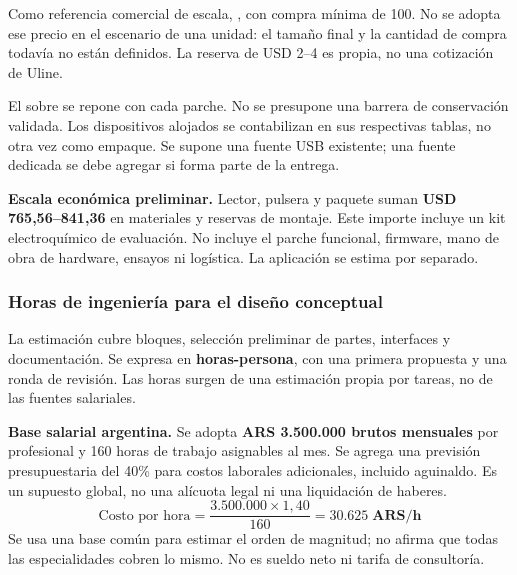 \documentclass[11pt,a4paper]{article}
\begin{document}
\small
Como referencia comercial de escala, , con compra mínima de 100. No se adopta ese precio en el escenario de una unidad: el tamaño final y la cantidad de compra todavía no están definidos. La reserva de USD 2--4 es propia, no una cotización de Uline.

El sobre se repone con cada parche. No se presupone una barrera de conservación validada. Los dispositivos alojados se contabilizan en sus respectivas tablas, no otra vez como empaque. Se supone una fuente USB existente; una fuente dedicada se debe agregar si forma parte de la entrega.

\textbf{Escala económica preliminar.} Lector, pulsera y paquete suman \textbf{USD 765,56--841,36} en materiales y reservas de montaje. Este importe incluye un kit electroquímico de evaluación. No incluye el parche funcional, firmware, mano de obra de hardware, ensayos ni logística. La aplicación se estima por separado.

\TPsalto
\subsubsection*{Horas de ingeniería para el diseño conceptual}
\small
La estimación cubre bloques, selección preliminar de partes, interfaces y documentación.
Se expresa en \textbf{horas-persona}, con una primera propuesta y una ronda de revisión.
Las horas surgen de una estimación propia por tareas, no de las fuentes salariales.

\textbf{Base salarial argentina.} Se adopta \textbf{ARS 3.500.000 brutos mensuales}
por profesional y 160 horas de trabajo asignables al mes. Se agrega una previsión
presupuestaria del 40\% para costos laborales adicionales, incluido aguinaldo.
Es un supuesto global, no una alícuota legal ni una liquidación de haberes.
\[
\mbox{Costo por hora} = \frac{3.500.000\times 1{,}40}{160}
= \mathbf{30.625\;ARS/h}
\]
Se usa una base común para estimar el orden de magnitud; no afirma que todas las
especialidades cobren lo mismo. No es sueldo neto ni tarifa de consultoría.
\end{document}
